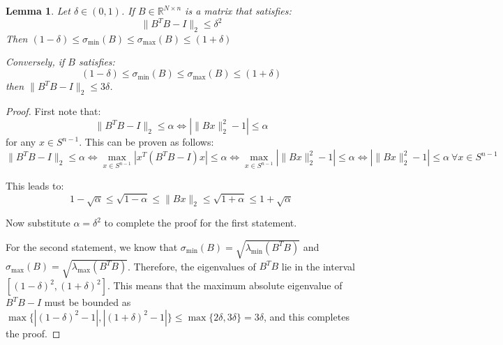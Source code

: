 \documentclass{article}
\newtheorem{lemma}{Lemma}[subsection]
\theoremstyle{remark}
\newcommand{\real}{\mathbb{R}}
\begin{document}
\begin{lemma}
Let \(\delta \in (0, 1)\). If \(B \in \real^{N \times n}\) is a matrix that satisfies:
\begin{equation*}
\|B^{T}B - I\|_{2} \leq \delta^{2}
\end{equation*}
Then \((1 - \delta) \leq \sigma_{\min}(B) \leq \sigma_{\max}(B) \leq (1 + \delta)\)

Conversely, if \(B\) satisfies:
\begin{equation*}
(1 - \delta) \leq \sigma_{\min}(B) \leq \sigma_{\max}(B) \leq (1 + \delta)
\end{equation*}
then \(\|B^{T}B - I\|_{2} \leq 3\delta\).
\end{lemma}

\begin{proof}
First note that:
\begin{equation*}
\|B^{T}B - I\|_{2} \leq \alpha \Leftrightarrow |\|Bx\|_{2}^{2} - 1| \leq \alpha
\end{equation*}
for any \(x \in S^{n - 1}\).
This can be proven as follows:
\begin{equation*}
\|B^{T}B - I\|_{2} \leq \alpha \Leftrightarrow \max_{x \in S^{n-1}} |x^{T}(B^{T}B - I)x| \leq \alpha \Leftrightarrow \max_{x \in S^{n-1}} |\|Bx\|_{2}^{2} - 1| \leq \alpha \Leftrightarrow |\|Bx\|_{2}^{2} - 1| \leq \alpha ~\forall x \in S^{n-1}
\end{equation*}

This leads to:
\begin{equation*}
1 - \sqrt{\alpha} \leq \sqrt{1 - \alpha} \leq \|Bx\|_{2} \leq \sqrt{1 + \alpha} \leq 1 + \sqrt{\alpha}
\end{equation*}

Now substitute \(\alpha = \delta^{2}\) to complete the proof for the first statement.

For the second statement, we know that \(\sigma_{\min}(B) = \sqrt{\lambda_{\min}(B^{T}B)}\) and \(\sigma_{\max}(B) = \sqrt{\lambda_{\max}(B^{T}B)}\). Therefore, the eigenvalues of \(B^{T}B\) lie in the interval \([(1 - \delta)^{2}, (1 + \delta)^{2}]\). This means that the maximum absolute eigenvalue of \(B^{T}B - I\) must be bounded as \(\max\{|(1 - \delta)^{2} - 1|, |(1 + \delta)^{2} - 1|\} \leq \max\{2\delta, 3\delta\} = 3\delta\), and this completes the proof.
\end{proof}
\end{document}
